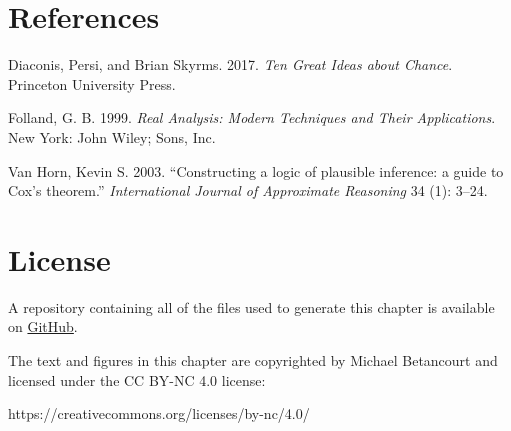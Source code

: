 \documentclass[
  letterpaper,
  DIV=11,
  numbers=noendperiod]{scrartcl}
\newlength{\cslhangindent}
\newlength{\cslentryspacingunit} %
\newenvironment{CSLReferences}[2] %
 {%
  \setlength{\parindent}{0pt}
  \ifodd #1
  \let\oldpar\par
  \def\par{\hangindent=\cslhangindent\oldpar}
  \fi
  \setlength{\parskip}{#2\cslentryspacingunit}
 }%
 {}
\begin{document}
\hypertarget{references}{%
\section*{References}\label{references}}

\hypertarget{refs}{}
\begin{CSLReferences}{1}{0}
\leavevmode{}%
Diaconis, Persi, and Brian Skyrms. 2017. \emph{Ten Great Ideas about
Chance}. Princeton University Press.

\leavevmode{}%
Folland, G. B. 1999. \emph{Real Analysis: Modern Techniques and Their
Applications}. New York: John Wiley; Sons, Inc.

\leavevmode{}%
Van Horn, Kevin S. 2003. {``{Constructing a logic of plausible
inference: a guide to {C}ox's theorem}.''} \emph{{International Journal
of Approximate Reasoning}} 34 (1): 3--24.

\end{CSLReferences}

\hypertarget{license}{%
\section*{License}\label{license}}

A repository containing all of the files used to generate this chapter
is available on
\href{https://github.com/betanalpha/quarto_chapters/tree/main/4_probability_on_general_spaces}{GitHub}.

The text and figures in this chapter are copyrighted by Michael
Betancourt and licensed under the CC BY-NC 4.0 license:

https://creativecommons.org/licenses/by-nc/4.0/
\end{document}
